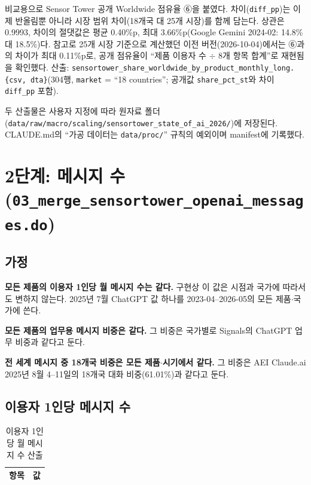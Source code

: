 \documentclass[11pt]{article}
\begin{document}
비교용으로 Sensor Tower 공개 Worldwide 점유율 ⑥을 붙였다. 차이(\texttt{diff\_pp})는 이제 반올림뿐 아니라 시장 범위 차이(18개국 대 25개 시장)를 함께 담는다. 상관은 0.9993, 차이의 절댓값은 평균 0.40\%p, 최대 3.66\%p(Google Gemini 2024-02: 14.8\% 대 18.5\%)다. 참고로 25개 시장 기준으로 계산했던 이전 버전(2026-10-04)에서는 ⑥과의 차이가 최대 0.11\%p로, 공개 점유율이 ``제품 이용자 수 $\div$ 8개 항목 합계''로 재현됨을 확인했다. 산출: \texttt{sensortower\_share\_worldwide\_by\_product\_monthly\_long.\{csv, dta\}}(304행, \texttt{market} = ``18 countries''; 공개값 \texttt{share\_pct\_st}와 차이 \texttt{diff\_pp} 포함).

두 산출물은 사용자 지정에 따라 원자료 폴더(\texttt{data/raw/macro/scaling/sensortower\_state\_of\_ai\_2026/})에 저장된다. CLAUDE.md의 ``가공 데이터는 \texttt{data/proc/}'' 규칙의 예외이며 manifest에 기록했다.

\section{2단계: 메시지 수(\texttt{03\_merge\_sensortower\_openai\_messages.do})}

\subsection{가정}
\begin{description}[leftmargin=1.2cm,style=nextline]
  \item[(A1)] \textbf{모든 제품의 이용자 1인당 월 메시지 수는 같다.} 구현상 이 값은 시점과 국가에 따라서도 변하지 않는다. 2025년 7월 ChatGPT 값 하나를 2023-04--2026-05의 모든 제품$\cdot$국가에 쓴다.
  \item[(A2)] \textbf{모든 제품의 업무용 메시지 비중은 같다.} 그 비중은 국가별로 Signals의 ChatGPT 업무 비중과 같다고 둔다.
  \item[(A3)] \textbf{전 세계 메시지 중 18개국 비중은 모든 제품$\cdot$시기에서 같다.} 그 비중은 AEI Claude.ai 2025년 8월 4--11일의 18개국 대화 비중(61.01\%)과 같다고 둔다.
\end{description}

\subsection{이용자 1인당 메시지 수}
\begin{table}[h]
\centering
\caption{이용자 1인당 월 메시지 수 산출}\label{tab:anchor}
\begin{tabular}{lr}
\toprule
항목 & 값 \\
\midrule

\bottomrule
\end{tabular}
\end{table}
\end{document}
